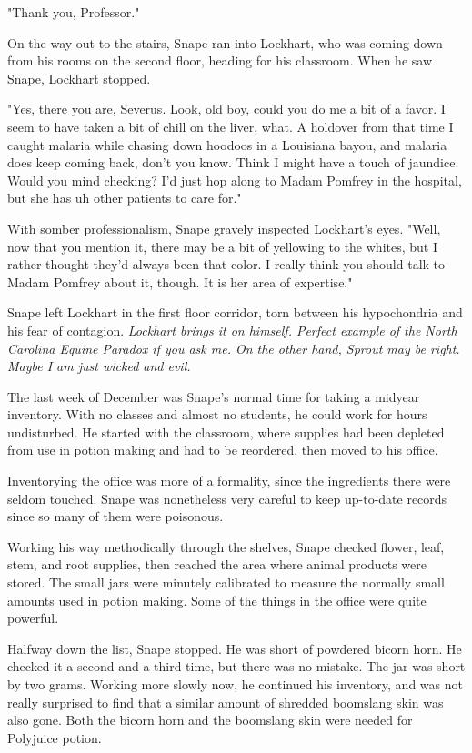 "Thank you, Professor."

On the way out to the stairs, Snape ran into Lockhart, who was coming down from his rooms on the second floor, heading for his classroom. When he saw Snape, Lockhart stopped.

"Yes, there you are, Severus. Look, old boy, could you do me a bit of a favor. I seem to have taken a bit of chill on the liver, what. A holdover from that time I caught malaria while chasing down hoodoos in a Louisiana bayou, and malaria does keep coming back, don't you know. Think I might have a touch of jaundice. Would you mind checking? I'd just hop along to Madam Pomfrey in the hospital, but she has{\el} uh{\el} other patients to care for."

With somber professionalism, Snape gravely inspected Lockhart's eyes. "Well, now that you mention it, there may be a bit of yellowing to the whites, but I rather thought they'd always been that color. I really think you should talk to Madam Pomfrey about it, though. It is her area of expertise."

Snape left Lockhart in the first floor corridor, torn between his hypochondria and his fear of contagion. \emph{Lockhart brings it on himself. Perfect example of the North Carolina Equine Paradox if you ask me. On the other hand, Sprout may be right. Maybe I am just wicked and evil.}

The last week of December was Snape's normal time for taking a midyear inventory. With no classes and almost no students, he could work for hours undisturbed. He started with the classroom, where supplies had been depleted from use in potion making and had to be reordered, then moved to his office.

Inventorying the office was more of a formality, since the ingredients there were seldom touched. Snape was nonetheless very careful to keep up-to-date records since so many of them were poisonous.

Working his way methodically through the shelves, Snape checked flower, leaf, stem, and root supplies, then reached the area where animal products were stored. The small jars were minutely calibrated to measure the normally small amounts used in potion making. Some of the things in the office were quite powerful.

Halfway down the list, Snape stopped. He was short of powdered bicorn horn. He checked it a second and a third time, but there was no mistake. The jar was short by two grams. Working more slowly now, he continued his inventory, and was not really surprised to find that a similar amount of shredded boomslang skin was also gone. Both the bicorn horn and the boomslang skin were needed for Polyjuice potion.

